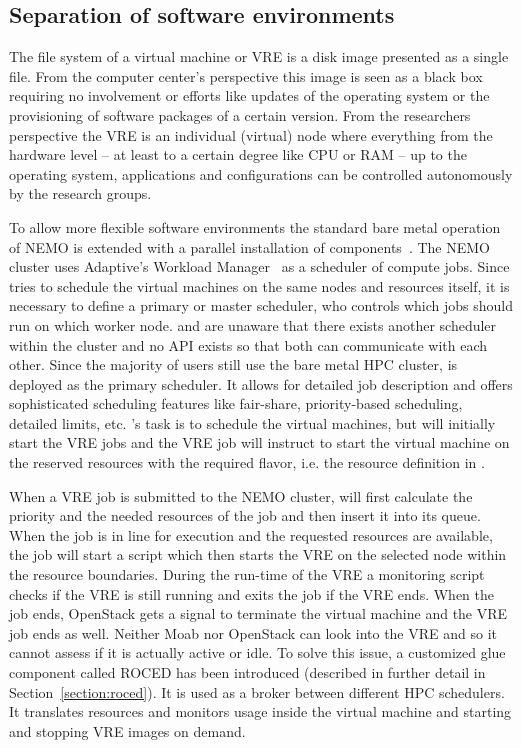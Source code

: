 \subsection{Separation of software environments}

The file system of a virtual machine or VRE is a
disk image presented as a single file. From the computer center's perspective
this image is seen as a black box requiring no involvement or efforts like
updates of the operating system or the provisioning of software packages of a
certain version. From the researchers perspective the VRE is an individual
(virtual) node where everything from the hardware level -- at least to a
certain degree like CPU or RAM -- up to the operating system,
applications and configurations can be controlled autonomously by the research groups.

To allow more flexible software environments the standard bare metal
operation of NEMO is extended with a parallel installation of \Openstack
components~\cite{hpc-symp:2016}.
The NEMO cluster uses Adaptive's \Moab Workload Manager~\cite{Moab} as a
scheduler of compute jobs.
Since \Openstack tries to schedule the virtual machines on the same nodes and
resources itself, it is necessary to define a primary or master scheduler, who
controls which jobs should run on which worker node. \Moab and \Openstack are
unaware that there exists another scheduler within the cluster and no API exists
so that both can communicate with each other. Since the majority of users still use the
bare metal HPC cluster, \Moab is deployed as the primary scheduler. It allows for
detailed job description and offers sophisticated scheduling features like
fair-share, priority-based scheduling, detailed limits,
etc. \Openstack 's task is to schedule the virtual machines, but \Moab will initially start the VRE
jobs and the VRE job will instruct \Openstack to start the virtual machine on the
reserved resources with the required flavor, i.e. the resource definition in \Openstack.

When a VRE job is submitted to the NEMO cluster, \Moab will first calculate the
priority and the needed resources of the job and then insert it into its queue.
When the job is in line for execution and the requested resources are available,
the job will start a script which then starts the VRE on the selected node
within the resource boundaries. During the run-time of the VRE a monitoring
script checks if the VRE is still running and exits the job if the VRE ends.
When the job ends, OpenStack gets a signal to terminate the virtual machine and
the VRE job ends as well.  Neither Moab nor OpenStack can look into the VRE and
so it cannot assess if it is actually active or idle. To solve this issue, a
customized glue component called ROCED has been introduced (described in
further detail in Section~\ref{section:roced}).  It is used as a broker between
different HPC schedulers. It translates resources and monitors usage inside the
virtual machine and starting and stopping VRE images on demand.
